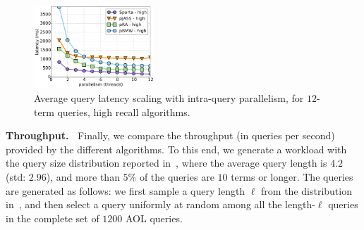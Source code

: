 {{\begin{figure}[tbh]
\centering
{}
         \includegraphics[width=0.4\textwidth]{figures/latency_12terms_clueweb.pdf}
\caption{Average query latency scaling with intra-query parallelism, for $12$-term queries, high recall algorithms.}
\label{fig:threads-scaling}
\end{figure}

{\bf Throughput.\ } Finally, we compare the throughput (in queries per second) provided by the different
algorithms. To this end, we generate a workload with the query size distribution reported in~\cite{sigir/Guy16},
where the average query length is $4.2$ (std: $2.96$), and more than $5\%$ of the queries are $10$ terms or longer.
The queries are generated as follows: we first sample a query length $\ell$ from the distribution in~\cite{sigir/Guy16}, and then 
select a query uniformly at random among all the length-$\ell$ queries in the complete set of  $1200$ AOL queries. 

}}
